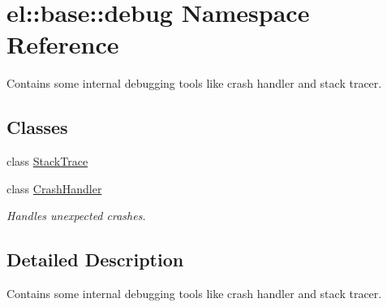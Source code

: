 \hypertarget{namespaceel_1_1base_1_1debug}{\section{el\-:\-:base\-:\-:debug Namespace Reference}
\label{namespaceel_1_1base_1_1debug}
}


Contains some internal debugging tools like crash handler and stack tracer.  


\subsection*{Classes}
\begin{DoxyCompactItemize}
\item 
class \hyperlink{classel_1_1base_1_1debug_1_1StackTrace}{Stack\-Trace}
\item 
class \hyperlink{classel_1_1base_1_1debug_1_1CrashHandler}{Crash\-Handler}
\begin{DoxyCompactList}\small\item\em Handles unexpected crashes. \end{DoxyCompactList}\end{DoxyCompactItemize}


\subsection{Detailed Description}
Contains some internal debugging tools like crash handler and stack tracer. 